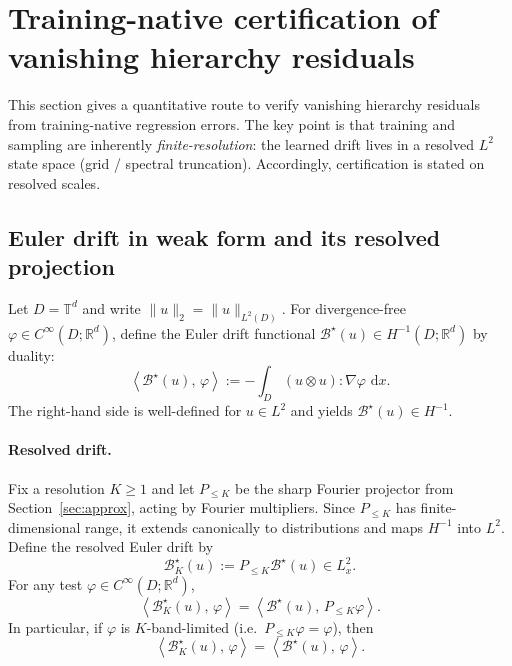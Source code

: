 \documentclass{article}
\numberwithin{equation}{section}
\theoremstyle{plain}
\theoremstyle{definition}
\theoremstyle{remark}
\newcommand{\R}{\mathbb{R}}
\newcommand{\T}{\mathbb{T}}
\newcommand{\dd}{\,\mathrm{d}}
\newcommand{\ip}[2]{\left\langle #1,\,#2 \right\rangle}
\begin{document}
\section{Training-native certification of vanishing hierarchy residuals}
\label{sec:training}

This section gives a quantitative route to verify vanishing hierarchy residuals from training-native regression errors.
The key point is that training and sampling are inherently \emph{finite-resolution}: the learned drift lives in a resolved
$L^2$ state space (grid / spectral truncation). Accordingly, certification is stated on resolved scales.

\subsection{Euler drift in weak form and its resolved projection}

Let $D=\T^d$ and write $\|u\|_2=\|u\|_{L^2(D)}$.
For divergence-free $\varphi\in C^\infty(D;\R^d)$, define the Euler drift functional
$\mathcal B^\star(u)\in H^{-1}(D;\R^d)$ by duality:
\begin{equation}\label{eq:Euler-drift}
\ip{\mathcal B^\star(u)}{\varphi}
:= -\int_D (u\otimes u):\nabla\varphi\,\dd x.
\end{equation}
The right-hand side is well-defined for $u\in L^2$ and yields $\mathcal B^\star(u)\in H^{-1}$.

\paragraph{Resolved drift.}
Fix a resolution $K\ge 1$ and let $P_{\le K}$ be the sharp Fourier projector from Section~\ref{sec:approx}, acting by Fourier
multipliers. Since $P_{\le K}$ has finite-dimensional range, it extends canonically to distributions and maps $H^{-1}$ into
$L^2$. Define the resolved Euler drift by
\begin{equation}\label{eq:Euler-drift-resolved}
\mathcal B^\star_K(u):=P_{\le K}\mathcal B^\star(u)\in L^2_x.
\end{equation}
For any test $\varphi\in C^\infty(D;\R^d)$,
\begin{equation}\label{eq:proj-duality}
\ip{\mathcal B^\star_K(u)}{\varphi}
=
\ip{\mathcal B^\star(u)}{P_{\le K}\varphi}.
\end{equation}
In particular, if $\varphi$ is $K$-band-limited (i.e.\ $P_{\le K}\varphi=\varphi$), then
\begin{equation}\label{eq:bandlimited-equality}
\ip{\mathcal B^\star_K(u)}{\varphi}=\ip{\mathcal B^\star(u)}{\varphi}.
\end{equation}
\end{document}
